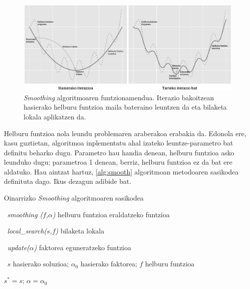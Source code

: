 \documentclass[eu]{ifirak}\usepackage[]{graphicx}\usepackage[]{color}
\begin{document}
\begin{figure}[t]
\centering
\includegraphics[width=\linewidth]{./Irudiak/smoothing}
\caption{\textit{Smoothing} algoritmoaren funtzionamendua. Iterazio bakoitzean hasierako helburu funtzioa maila bateraino leuntzen da eta bilaketa lokala aplikatzen da.}
\label{fig:smoothing}
\end{figure}

Helburu funtzioa nola leundu problemaren araberakoa erabakia da. Edonola ere, kasu guztietan, algoritmoa inplementatu ahal izateko leuntze-parametro bat definitu beharko dugu. Parametro hau handia denean, helburu funtzioa asko leunduko dugu; parametroa 1 denean, berriz, helburu funtzioa ez da bat ere aldatuko. Hau aintzat hartuz, \ref{alg:smooth} algoritmoan metodoaren sasikodea definituta dago. Ikus dezagun adibide bat.

\begin{ifalgorithm}[t]
\begin{ifpseudo}{Oinarrizko \textit{Smoothing} algoritmoaren sasikodea}
\item \In\ \textit{smoothing ($f$,$\alpha$)} helburu funtzioa eraldatzeko funtzioa
\item \In\ \textit{local\_search($s$,$f$)} bilaketa lokala
\item \In\ \textit{update($\alpha$)} faktorea eguneratzeko funtzioa
\item \In\ $s$ hasierako soluzioa; $\alpha_0$ hasierako faktorea; $f$ helburu funtzioa
\item  $s^* = s$; $\alpha=\alpha_0$
\item {} \Do
\item {}
\item {}
\item {}
\item \Done
\end{ifpseudo}
\caption{\textit{Smoothing} algoritmoaren sasikodea}\label{alg:smooth}
\end{ifalgorithm}
\end{document}
